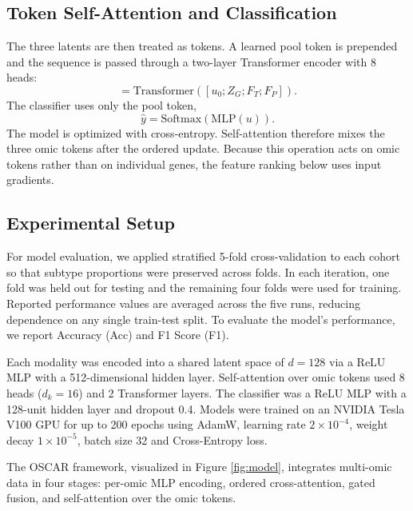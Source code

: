 \documentclass[lettersize,journal]{IEEEtran}
\begin{document}
\subsection{Token Self-Attention and Classification}
The three latents are then treated as tokens. A learned pool token is prepended and the sequence is passed through a two-layer Transformer encoder \cite{Vaswani2017Attention} with 8 heads:
\begin{equation}
    [u; \tilde{Z}_G; \tilde{F}_T; \tilde{F}_P]
    = \mathrm{Transformer}([u_0; Z_G; F_T; F_P]).
\end{equation}
The classifier uses only the pool token,
\begin{equation}
    \hat{y} = \mathrm{Softmax}(\mathrm{MLP}(u)).
\end{equation}
The model is optimized with cross-entropy. Self-attention therefore mixes the three omic tokens after the ordered update. Because this operation acts on omic tokens rather than on individual genes, the feature ranking below uses input gradients.

\subsection{Experimental Setup}
For model evaluation, we applied stratified 5-fold cross-validation to each cohort so that subtype proportions were preserved across folds. In each iteration, one fold was held out for testing and the remaining four folds were used for training. Reported performance values are averaged across the five runs, reducing dependence on any single train-test split. To evaluate the model’s performance, we report Accuracy (Acc) and F1 Score (F1).

Each modality was encoded into a shared latent space of $d=128$ via a ReLU MLP with a 512-dimensional hidden layer. Self-attention over omic tokens used 8 heads ($d_k=16$) and 2 Transformer layers. The classifier was a ReLU MLP with a 128-unit hidden layer and dropout 0.4. Models were trained on an NVIDIA Tesla V100 GPU for up to 200 epochs using AdamW, learning rate $2 \times 10^{-4}$, weight decay $1 \times 10^{-5}$, batch size 32 and Cross-Entropy loss.

The OSCAR framework, visualized in Figure \ref{fig:model}, integrates multi-omic data in four stages: per-omic MLP encoding, ordered cross-attention, gated fusion, and self-attention over the omic tokens.
\end{document}
